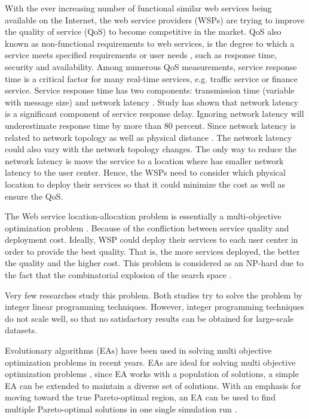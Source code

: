 \documentclass[twoside]{article}
\begin{document}
With the ever increasing number of functional similar web services being available on the Internet, the web service providers (WSPs) are trying to improve the quality of service (QoS) to become competitive in the market.  
QoS also known as non-functional requirements to  web services, is the degree to which a service meets specified requirements or user needs \cite{4061431}, such as response time, security and availability. 
Among numerous QoS measurements, service response time is a critical factor for many real-time services, e.g. traffic service or finance service. 
Service response time has two components: transmission time (variable with message size) and network latency \cite{Johansson:2000:INL:595252.595281}. 
Study \cite{Johansson:2000:INL:595252.595281, 916684} has shown that network latency is a significant component of service response delay.
Ignoring network latency will underestimate response time by more than 80 percent. Since network latency is related to network topology as well as physical distance \cite{distanceMetrics}. 
The network latency could also vary with the network topology changes.
The only way to reduce the network latency is move the service to a location where has smaller network latency to the user center. 
Hence, the WSPs need to consider which physical location to deploy their services so that it could minimize the cost as well as ensure the QoS.

The Web service location-allocation problem is essentially a multi-objective optimization problem \cite{Multiobjective}.
Because of the confliction between service quality and deployment cost. 
Ideally, WSP could deploy their services to each user center in order to provide the best quality.
That is, the more services deployed, the better the quality and the higher cost. 
This problem is considered as an NP-hard due to the fact that the combinatorial explosion of the search space \cite{Vanrompay:2008:GAO:1387309.1387313}. 


Very few researches \cite{Aboolian200964, Sun:2006:LMW:1217741.1217754} study this problem.
Both studies try to solve the problem by integer linear programming techniques.
However, integer programming techniques do not scale well, so that no satisfactory results can be obtained for large-scale datasets. 

Evolutionary algorithms (EAs) have been used in solving multi objective optimization problems in recent years. 
EAs are ideal for solving multi objective optimization problems \cite{key:article}, since EA works with a population of solutions, a simple EA can be extended to maintain a diverse set of solutions.
With an emphasis for moving toward the true Pareto-optimal region, an EA can be used to find multiple Pareto-optimal solutions in one single simulation run \cite{OptimizationElectrical}.
\end{document}
